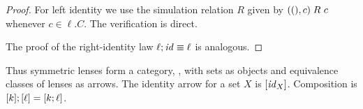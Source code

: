 \begin{defn}[$R$-similarity]
\begin{theorem}
\iffull
\begin{proof}
For left identity we use the simulation relation $R$ given by $({()},c)
\mathrel{R_{}} c$ whenever $c\in \ell.C$. The verification is direct. 

The proof of the right-identity law $\ell;\mathit{id} \equiv \ell$ is analogous.
\end{proof}
\fi

Thus symmetric lenses form a category, \LENS, with sets as objects and
equivalence classes of lenses as arrows.  The identity arrow for a set
$X$ is 
$[\mathit{id}_X]$. Composition is $[k];[\ell] =
[k;\ell]$.  


\end{theorem}
\end{defn}
